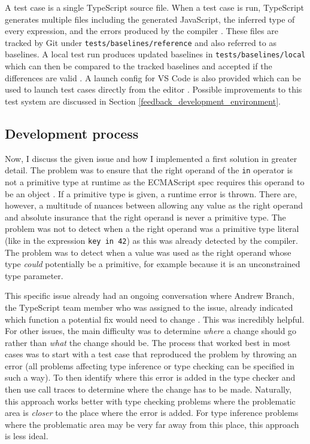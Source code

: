 \documentclass[12pt]{scrartcl}
\def\code#1{\texttt{\frenchspacing#1}}
\begin{document}
A test case is a single TypeScript source file. When a test case is run, TypeScript generates multiple files including the generated JavaScript, the inferred type of every expression, and the errors produced by the compiler \cite{ContributingGuidelines}. These files are tracked by Git under \code{tests/baselines/reference} and also referred to as baselines. A local test run produces updated baselines in \code{tests/baselines/local} which can then be compared to the tracked baselines and accepted if the differences are valid \cite{ContributingGuidelines}. A launch config for VS Code is also provided which can be used to launch test cases directly from the editor \cite{ContributingGuidelines}. Possible improvements to this test system are discussed in Section \ref{feedback_development_environment}.

\subsection{Development process}

Now, I discuss the given issue and how I implemented a first solution in greater detail. The problem was to ensure that the right operand of the \code{in} operator is not a primitive type at runtime as the ECMAScript spec requires this operand to be an object \cite{InOperator}. If a primitive type is given, a runtime error is thrown. There are, however, a multitude of nuances between allowing any value as the right operand and absolute insurance that the right operand is never a primitive type. The problem was not to detect when a the right operand was a primitive type literal (like in the expression \code{key in 42}) as this was already detected by the compiler. The problem was to detect when a value was used as the right operand whose type \textit{could} potentially be a primitive, for example because it is an unconstrained type parameter.

This specific issue already had an ongoing conversation where Andrew Branch, the TypeScript team member who was assigned to the issue, already indicated which function a potential fix would need to change \cite{41317Comment}. This was incredibly helpful. For other issues, the main difficulty was to determine \textit{where} a change should go rather than \textit{what} the change should be. The process that worked best in most cases was to start with a test case that reproduced the problem by throwing an error (all problems affecting type inference or type checking can be specified in such a way). To then identify where this error is added in the type checker and then use call traces to determine where the change has to be made. Naturally, this approach works better with type checking problems where the problematic area is \textit{closer} to the place where the error is added. For type inference problems where the problematic area may be very far away from this place, this approach is less ideal.
\end{document}
